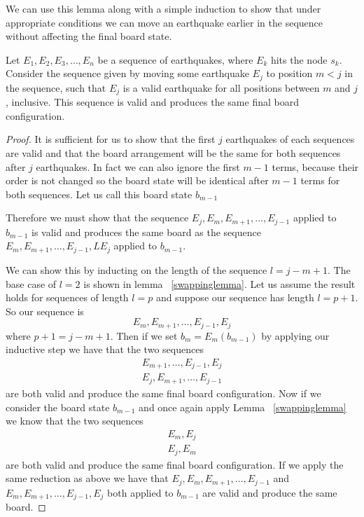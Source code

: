 \documentclass[runningheads,a4paper]{llncs}
\begin{document}
We can use this lemma along with a simple induction to show that under appropriate conditions we can move an earthquake earlier in the sequence without affecting the final board state.
\begin{lemma}
Let $E_1,E_2,E_3,\dots, E_n$ be a sequence of earthquakes, where $E_k$ hits the node $s_k$. Consider  the sequence given by moving some earthquake $E_j$ to position $m<j$ in the sequence, such that $E_j$ is a valid earthquake for all positions between $m$ and $j$, inclusive. 
This sequence is valid and produces the same final board configuration.
\end{lemma}
\label{shiftlemma}
\begin{proof}
It is sufficient for us to show that the first $j$ earthquakes of each sequences are valid and that the board arrangement will be the same for both sequences after $j$ earthquakes. In fact we can also ignore the first $m-1$ terms, because their order is not changed so the board state will be identical after $m-1$ terms for both sequences. Let us call this board state $b_{m-1}$

Therefore we must show that the sequence $E_j, E_m, E_{m+1}, \ldots, E_{j-1}$ applied to $b_{m-1}$ is valid and produces the same board as the sequence $E_m, E_{m+1}, \ldots, E_{j-1}, LE_j$ applied to $b_{m-1}$. 

We can show this by inducting on the length of the sequence $l=j-m+1$. The base case of $l=2$ is shown in lemma ~\ref{swappinglemma}. Let us assume the result holds for sequences of length $l=p$ and suppose our sequence has length $l=p+1$. So our sequence is 
\begin{equation*}
E_m, E_{m+1}, \ldots, E_{j-1}, E_j
\end{equation*}
where $p+1=j-m+1$. Then if we set $b_{m} = E_{m} (b_{m-1})$ by applying our inductive step we have that the two sequences 
\begin{align*}
E_{m+1}, \ldots, E_{j-1}, E_{j} \\ 
E_{j}, E_{m+1}, \ldots,  E_{j-1} 
\end{align*}
are both valid and produce the same final board configuration. Now if we consider the board state $b_{m-1}$ and once again apply Lemma ~\ref{swappinglemma} we know that the two sequences 
\begin{align*}
E_{m}, E_{j} \\
E_{j}, E_{m}
\end{align*}
are both valid and produce the same final board configuration. If we apply the same reduction as above  we have  that $E_j, E_m, E_{m+1}, \ldots, E_{j-1}$  and $E_m, E_{m+1}, \ldots, E_{j-1}, E_j$ both applied to $b_{m-1}$ are valid and produce the same board. 
\end{proof}
\end{document}
